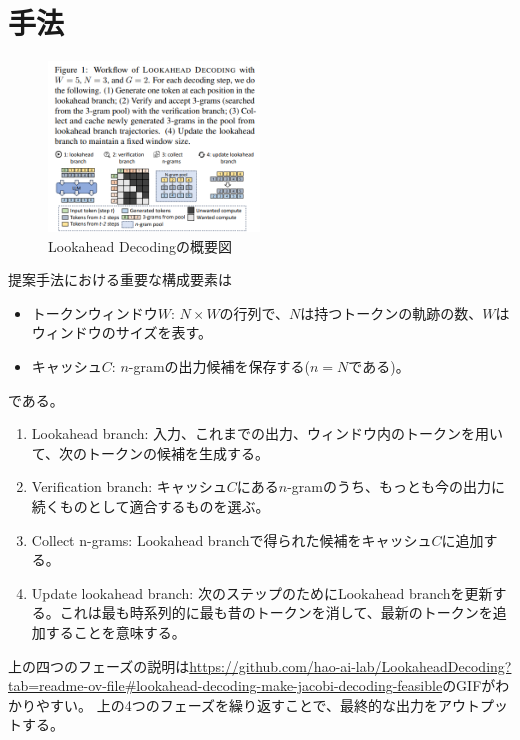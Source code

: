 \documentclass[uplatex]{jsarticle}
\theoremstyle{remark}
\newenvironment{method}[1]{
    \begin{tcolorbox}[
        colframe=green!50!black,
        colback=green!50!black!10!white,
        colbacktitle=green!50!black!40!white,
        coltitle=black,
        fonttitle=\bfseries,
        title={#1}
    ]
}{
    \end{tcolorbox}
}
\begin{document}
\section{手法}
\begin{figure}
    \centering
    \includegraphics[width=0.5\textwidth]{img/lookahead_decoding/overview.png}
    \caption{Lookahead Decodingの概要図}
    \label{fig:overview}
\end{figure}

\begin{method}{Lookahead Decoding}
提案手法における重要な構成要素は
\begin{itemize}
    \item トークンウィンドウ$W$: $N \times W$の行列で、$N$は持つトークンの軌跡の数、$W$はウィンドウのサイズを表す。
    \item キャッシュ$C$: $n$-gramの出力候補を保存する($n = N$である)。
\end{itemize}
である。

\begin{enumerate}
    \item Lookahead branch: 入力、これまでの出力、ウィンドウ内のトークンを用いて、次のトークンの候補を生成する。
    \item Verification branch: キャッシュ$C$にある$n$-gramのうち、もっとも今の出力に続くものとして適合するものを選ぶ。
    \item Collect n-grams: Lookahead branchで得られた候補をキャッシュ$C$に追加する。
    \item Update lookahead branch: 次のステップのためにLookahead branchを更新する。これは最も時系列的に最も昔のトークンを消して、最新のトークンを追加することを意味する。
\end{enumerate}
上の四つのフェーズの説明は\url{https://github.com/hao-ai-lab/LookaheadDecoding?tab=readme-ov-file#lookahead-decoding-make-jacobi-decoding-feasible}のGIFがわかりやすい。
上の4つのフェーズを繰り返すことで、最終的な出力をアウトプットする。
\end{method}
\end{document}
